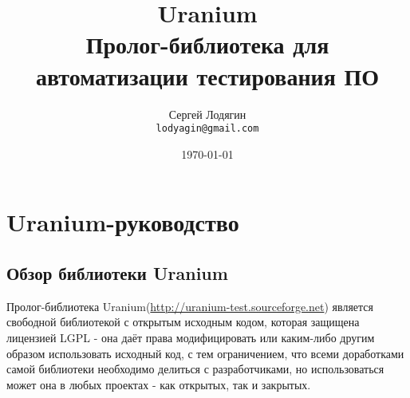 \documentclass[a4paper]{book}
\def\ur{Uranium}
\begin{document}
\title{{\bf\ur}\\ \medskip  Пролог-библиотека для автоматизации
  тестирования ПО}
\author{Сергей Лодягин\\ \texttt{lodyagin@gmail.com}}
\date{\today}
\maketitle

\tableofcontents

\part{\ur-руководство}
\chapter{Обзор библиотеки \ur}

Пролог-библиотека \ur (\url{http://uranium-test.sourceforge.net})
является свободной библиотекой с открытым исходным кодом, которая
защищена лицензией LGPL - она даёт права модифицировать или
каким-либо другим образом использовать исходный код, с тем
ограничением, что всеми доработками самой библиотеки необходимо
делиться с разработчиками, но использоваться может она в любых
проектах - как открытых, так и закрытых.
\end{document}
